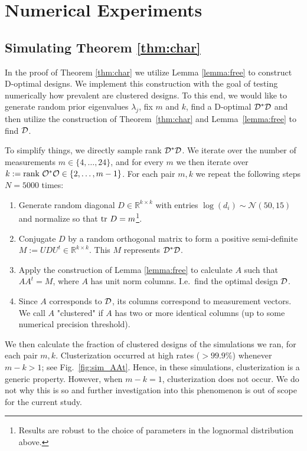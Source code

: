\section{Numerical Experiments}


\subsection{Simulating Theorem \ref{thm:char}}\label{subsec:lemma_sims}
In the proof of Theorem \ref{thm:char} we utilize Lemma
\ref{lemma:free} to construct D-optimal designs. We implement this
construction with the goal of testing numerically how prevalent are
clustered designs. To this end, we would like to generate random prior
eigenvalues $\lambda_j$, fix $m$ and $k$, find a D-optimal
$\mathcal{D}^*\mathcal{D}$ and then utilize the construction of
Theorem~\ref{thm:char} and Lemma~\ref{lemma:free} to find $\mathcal{D}$.


To simplify things, we directly sample rank $\mathcal{D}^*\mathcal{D}$. We iterate
over the number of measurements $m \in \{4,\dots, 24\}$, and for every
$m$ we then iterate over $k:=\textup{rank}\  \mathcal{O}^*\mathcal{O} \in \{2,\dots,
m-1\}$. For each pair $m,k$ we repeat the following steps $N=5000$
times:
\begin{enumerate}
\item Generate random diagonal $D\in \mathbb{R}^{k\times k}$ with
  entries $\log (d_i) \sim \mathcal{N}(50,15)$ and normalize so that
  $\textup{tr}\ D = m$\footnote{Results are robust to the choice of parameters
  in the lognormal distribution above.}.
\item Conjugate $D$ by a random orthogonal matrix to form a positive
  semi-definite $M := UDU^t \in \mathbb{R}^{k\times k}$. This $M$
  represents $\mathcal{D}^*\mathcal{D}$.
\item Apply the construction of Lemma \ref{lemma:free} to calculate
  $A$ such that $AA^t = M$, where $A$ has unit norm columns. I.e.~find
  the optimal design $\mathcal{D}$.
\item Since $A$ corresponds to $\mathcal{D}$, its columns correspond to
  measurement vectors. We call $A$ "clustered" if $A$ has two or more
  identical columns (up to some numerical precision threshold).
\end{enumerate}
We then calculate the fraction of clustered designs of the simulations
we ran, for each pair $m,k$. Clusterization occurred at high rates
($>99.9\%$) whenever $m-k > 1$; see Fig.~\ref{fig:sim_AAt}. Hence, in
these simulations, clusterization is a generic property. However, when
$m-k = 1$, clusterization does not occur. We do not why this is so and
further investigation into this phenomenon is out of scope for the
current study.

